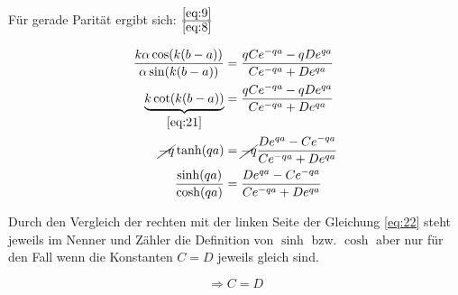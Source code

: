 Für gerade Parität ergibt sich:
\(\frac{\eqref{eq:9}}{\eqref{eq:8}}\)

\begin{align}  
  \frac{k\alpha\cos(k(b-a))}{\alpha\sin(k(b-a))} &= \frac{qCe^{-qa}-qDe^{qa}}{Ce^{-qa}+De^{qa}}\\
\underbrace{k\cot(k(b-a))}_{\eqref{eq:21}} &= \frac{qCe^{-qa}-qDe^{qa}}{Ce^{-qa}+De^{qa}}\\
\cancel{-q} \tanh(qa) &=\cancel{ -q} \frac{De^{qa}-Ce^{-qa}}{Ce^{-qa}+De^{qa}}\\
\frac{\sinh(qa)}{\cosh(qa)} &= \frac{De^{qa}-Ce^{-qa}}{Ce^{-qa}+De^{qa}}\label{eq:22}
\end{align}

Durch den Vergleich der rechten mit der linken Seite der Gleichung \eqref{eq:22} steht jeweils im Nenner und Zähler die Definition von \(\sinh\) bzw. \(\cosh\) aber nur für den Fall wenn die Konstanten \(C=D\) jeweils gleich sind.

\[\Rightarrow C=D\]



